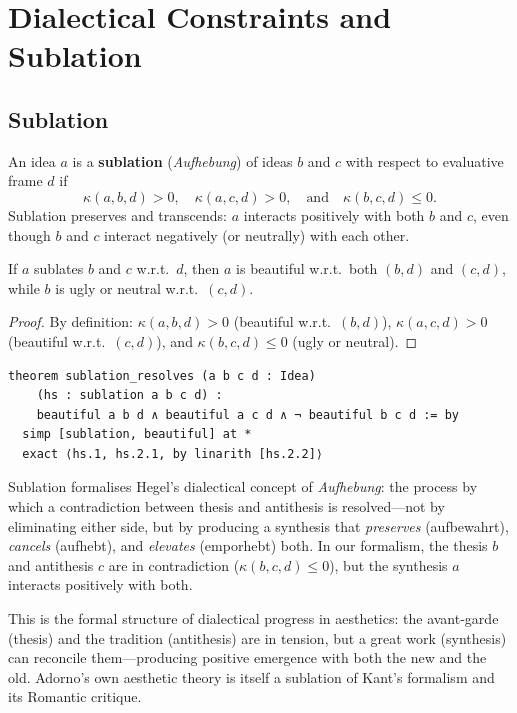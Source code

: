 \section{Dialectical Constraints and Sublation}
\label{sec:math-aesthetics:dialectic}

\subsection{Sublation}

\begin{definition}[Sublation]
\label{def:sublation}
An idea $a$ is a \textbf{sublation} (\emph{Aufhebung}) of ideas $b$ and $c$
with respect to evaluative frame $d$ if
\[
  \kappa(a, b, d) > 0,\quad \kappa(a, c, d) > 0,\quad
  \text{and}\quad \kappa(b, c, d) \leq 0.
\]
Sublation preserves and transcends: $a$ interacts positively with both $b$
and $c$, even though $b$ and $c$ interact negatively (or neutrally) with
each other.
\end{definition}

\begin{theorem}
\label{thm:sublation-resolves}
If $a$ sublates $b$ and $c$ w.r.t.\ $d$, then $a$ is beautiful w.r.t.\
both $(b, d)$ and $(c, d)$, while $b$ is ugly or neutral w.r.t.\ $(c, d)$.
\end{theorem}

\begin{proof}
By definition: $\kappa(a, b, d) > 0$ (beautiful w.r.t.\ $(b, d)$),
$\kappa(a, c, d) > 0$ (beautiful w.r.t.\ $(c, d)$), and
$\kappa(b, c, d) \leq 0$ (ugly or neutral).
\end{proof}

\begin{lstlisting}
theorem sublation_resolves (a b c d : Idea)
    (hs : sublation a b c d) :
    beautiful a b d ∧ beautiful a c d ∧ ¬ beautiful b c d := by
  simp [sublation, beautiful] at *
  exact ⟨hs.1, hs.2.1, by linarith [hs.2.2]⟩
\end{lstlisting}

\begin{interpretation}
\label{int:sublation-hegel}
Sublation formalises Hegel's dialectical concept of \emph{Aufhebung}:
the process by which a contradiction between thesis and antithesis is
resolved---not by eliminating either side, but by producing a synthesis
that \emph{preserves} (aufbewahrt), \emph{cancels} (aufhebt), and
\emph{elevates} (emporhebt) both.  In our formalism, the thesis $b$
and antithesis $c$ are in contradiction ($\kappa(b, c, d) \leq 0$), but
the synthesis $a$ interacts positively with both.

This is the formal structure of dialectical progress in aesthetics: the
avant-garde (thesis) and the tradition (antithesis) are in tension, but
a great work (synthesis) can reconcile them---producing positive emergence
with both the new and the old.  Adorno's own aesthetic theory is itself
a sublation of Kant's formalism and its Romantic critique.
\end{interpretation}

